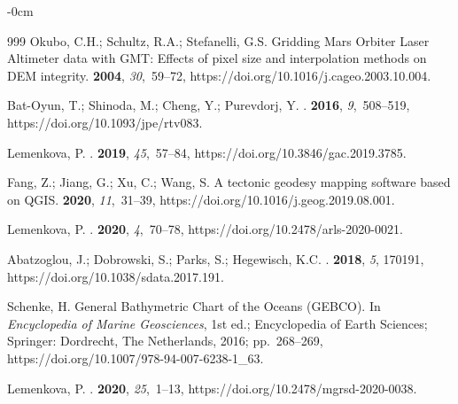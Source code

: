 \documentclass[geosciences,article,accept,pdftex,oneauthor]{Definitions/mdpi}
\begin{document}
\begin{adjustwidth}{-\extralength}{0cm}
\begin{thebibliography}{999}
Okubo, C.H.; Schultz, R.A.; Stefanelli, G.S.
\newblock Gridding Mars Orbiter Laser Altimeter data with GMT: Effects of pixel
  size and interpolation methods on DEM integrity.
 {\bf 2004}, {\em 30},~59--72, https://doi.org/10.1016/j.cageo.2003.10.004.

Bat-Oyun, T.; Shinoda, M.; Cheng, Y.; Purevdorj, Y.
.
 {\bf 2016}, {\em 9},~508--519, https://doi.org/10.1093/jpe/rtv083.

Lemenkova, P.
.
 {\bf 2019}, {\em 45},~57--84, https://doi.org/10.3846/gac.2019.3785.

Fang, Z.; Jiang, G.; Xu, C.; Wang, S.
\newblock A tectonic geodesy mapping software based on QGIS.
 {\bf 2020}, {\em 11},~31--39, https://doi.org/10.1016/j.geog.2019.08.001.

Lemenkova, P.
.
 {\bf 2020}, {\em 4},~70--78, https://doi.org/10.2478/arls-2020-0021.

Abatzoglou, J.; Dobrowski, S.; Parks, S.; Hegewisch, K.C.
.
 {\bf 2018}, {\em 5}, 170191, https://doi.org/10.1038/sdata.2017.191.

Schenke, H. {General Bathymetric Chart of the Oceans (GEBCO)}.
\newblock In {\em {Encyclopedia of Marine Geosciences}}, 1st ed.; {Encyclopedia
  of Earth Sciences}; Springer: Dordrecht, The Netherlands,  2016; pp.~268--269, https://doi.org/10.1007/978-94-007-6238-1\_63.

Lemenkova, P.
.
 {\bf 2020}, {\em 25},~1--13, https://doi.org/10.2478/mgrsd-2020-0038.


\end{thebibliography}
\end{adjustwidth}
\end{document}
